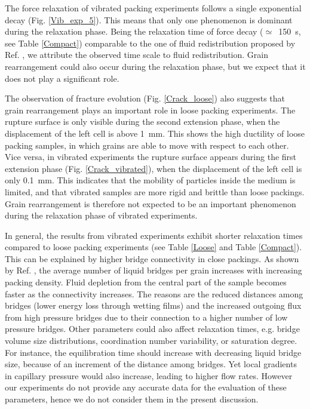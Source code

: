 The force relaxation of vibrated packing experiments follows a single exponential decay (Fig. \ref{Vib_exp_5}). This means that only one phenomenon is dominant during the relaxation phase. Being the relaxation time of force decay ($\simeq$~150~\si{s}, see Table \ref{Compact}) comparable to the one of fluid redistribution proposed by Ref. \cite{Herminghaus2005}, we attribute the observed time scale to fluid redistribution. Grain rearrangement could also occur during the relaxation phase, but we expect that it does not play a significant role.

The observation of fracture evolution (Fig. \ref{Crack_loose}) also suggests that grain rearrangement plays an important role in loose packing experiments. The rupture surface is only visible during the second extension phase, when the displacement of the left cell is above 1~\si{mm}. This shows the high ductility of loose packing samples, in which grains are able to move with respect to each other. Vice versa, in vibrated experiments the rupture surface appears during the first extension phase (Fig. \ref{Crack_vibrated}), when the displacement of the left cell is only 0.1~\si{mm}. This indicates that the mobility of particles inside the medium is limited, and that vibrated samples are more rigid and brittle than loose packings. Grain rearrangement is therefore not expected to be an important phenomenon during the relaxation phase of vibrated experiments.

In general, the results from vibrated experiments exhibit shorter relaxation times compared to loose packing experiments (see Table \ref{Loose} and Table \ref{Compact}). This can be explained by higher bridge connectivity in close packings. As shown by Ref. \cite{Kohonen2004}, the average number of liquid bridges per grain increases with increasing packing density. Fluid depletion from the central part of the sample becomes faster as the connectivity increases. The reasons are the reduced distances among bridges (lower energy loss through wetting films) and the increased outgoing flux from high pressure bridges due to their connection to a higher number of low pressure bridges. Other parameters could also affect relaxation times, e.g. bridge volume size distributions, coordination number variability, or saturation degree. For instance, the equilibration time should increase with decreasing liquid bridge size, because of an increment of the distance among bridges. Yet local gradients in capillary pressure would also increase, leading to higher flow rates. However our experiments do not provide any accurate data for the evaluation of these parameters, hence we do not consider them in the present discussion.


